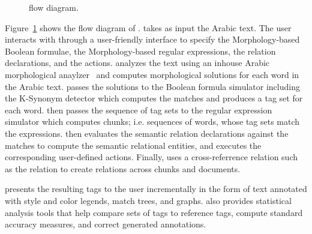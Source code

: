 
\begin{figure}[h!]
\centering
\resizebox{\columnwidth}{!}
{\tiny }
\caption{\framework flow diagram.}
\label{f:overview}
\end{figure}

Figure~\ref{f:overview} shows the flow diagram of \framework.
\framework takes as input the Arabic text. 
The user interacts with \framework through a user-friendly interface to specify the
Morphology-based Boolean formulae, the Morphology-based regular expressions, 
the relation declarations, and the actions.
\framework analyzes the text using an inhouse Arabic morphological anaylzer~\cite{sarf} and computes morphological solutions
for each word in the Arabic text.
\framework passes the solutions to the Boolean formula simulator including the K-Synonym detector 
which computes the matches and produces a tag set for each word.
\framework then passes the sequence of tag sets to the regular expression simulator which computes 
chunks; i.e. sequences of words, whose tag sets match the expressions. 
\framework then evaluates the semantic relation declarations against the matches to compute the semantic relational entities, 
and executes the corresponding user-defined actions. 
Finally, \framework uses a cross-referrence relation such as the  relation to create relations across chunks and 
documents. 

\framework presents the resulting tags to the user incrementally in the form of 
text annotated with style and color legends, match trees, and graphs.
\framework also provides statistical analysis tools that help compare sets of tags to reference tags,
compute standard accuracy measures, and correct generated annotations. 
